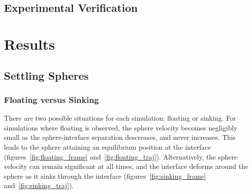 \documentclass[12pt]{article}
\begin{document}
\subsection{Experimental Verification}
\label{subsec:exp_verif}


\section{Results}
\label{sec:res}

\subsection{Settling Spheres}
\label{subsec:sphere_res}

\subsubsection{Floating versus Sinking}
\label{subsubsec:sphere_float}

There are two possible situations for each simulation: floating or sinking. For simulations where floating is observed, the sphere velocity becomes negligibly small as the sphere-interface separation descreases, and never increases. This leads to the sphere attaining an equilibrium position at the interface (figures~\ref{fig:floating_frame} and~\ref{fig:floating_traj}). Alternatively, the sphere velocity can remain significant at all times, and the interface deforms around the sphere as it sinks through the interface (figures~\ref{fig:sinking_frame} and~\ref{fig:sinking_traj}). 
\end{document}
